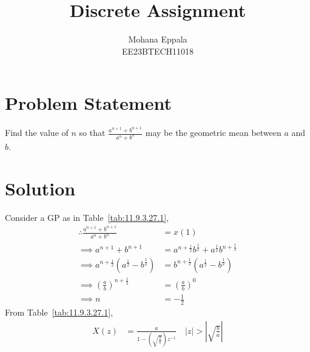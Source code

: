 \documentclass[12pt]{article}
\newcommand{\tabref}[1]{Table~\ref{#1}}
\providecommand{\abs}[1]{\left\vert#1\right\vert}
\begin{document}
\title{Discrete Assignment}
\author{Mohana Eppala\\ EE23BTECH11018}
\maketitle

\section*{Problem Statement}
Find the value of $n$ so that $\frac{a^{n+1} + b^{n+1}}{a^{n}+b^{n}}$ may be the geometric mean between $a$ and $b$.
\section*{Solution}
\fi

\begin{table}[h]

\end{table}

Consider a GP as in \tabref{tab:11.9.3.27.1},
\begin{align}
	\therefore \frac{a^{n+1} + b^{n+1}}{a^{n}+b^{n}} &= x(1) \\
	\implies a^{n+1} + b^{n+1} &= a^{n+\frac{1}{2}}b^{\frac{1}{2}} + a^{\frac{1}{2}}b^{n+\frac{1}{2}} \\
\implies a^{n+\frac{1}{2}}(a^{\frac{1}{2}} - b^{\frac{1}{2}}) &= b^{n+\frac{1}{2}}(a^{\frac{1}{2}} - b^{\frac{1}{2}}) \\
\implies (\frac{a}{b})^{n+\frac{1}{2}} &= (\frac{a}{b})^{0} \\
\implies n &= -\frac{1}{2}
\end{align}
From \tabref{tab:11.9.3.27.1},
\begin{align}
	X(z) &= \frac{a}{1-(\sqrt{\frac{b}{a}})z^{-1}} \quad \abs{z}>\abs{\sqrt{\frac{b}{a}}}
\end{align}
\end{document}
